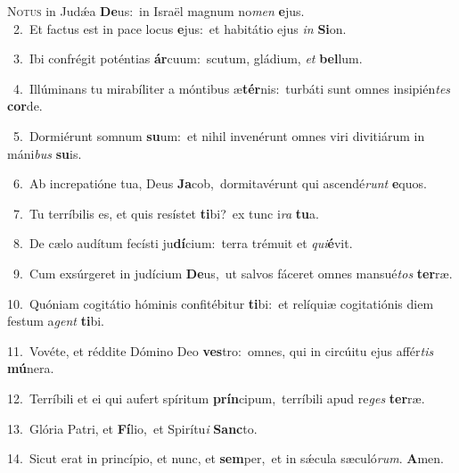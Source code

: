 \lettrine{\initial\textcolor{\initialcolor}{N}}{otus} in Judǽa \textbf{De}\-us:~\star in Israël magnum no\textit{men} \textbf{e}\-jus.\\
{\numbfont\textcolor{\numbcolor}{~2.}}~Et factus est in pace locus \textbf{e}\-jus:~\star et habitátio ejus \textit{in} \textbf{Si}\-on.\par
{\numbfont\textcolor{\numbcolor}{~3.}}~Ibi confrégit poténtias \textbf{ár}\-cuum:~\star scutum, gládium, \textit{et} \textbf{bel}\-lum.\par
{\numbfont\textcolor{\numbcolor}{~4.}}~Illúminans tu mirabíliter a móntibus æ\-\textbf{tér}\-nis:~\star turbáti sunt omnes insipién\textit{tes} \textbf{cor}\-de.\par
{\numbfont\textcolor{\numbcolor}{~5.}}~Dormiérunt somnum \textbf{su}\-um:~\star et nihil invenérunt omnes viri divitiárum in máni\textit{bus} \textbf{su}\-is.\par
{\numbfont\textcolor{\numbcolor}{~6.}}~Ab increpatióne tua, Deus \textbf{Ja}\-cob,~\star dormitavérunt qui ascendé\textit{runt} \textbf{e}\-quos.\par
{\numbfont\textcolor{\numbcolor}{~7.}}~Tu terríbilis es, et quis resístet \textbf{ti}\-bi?~\star ex tunc i\textit{ra} \textbf{tu}\-a.\par
{\numbfont\textcolor{\numbcolor}{~8.}}~De cælo audítum fecísti ju\-\textbf{dí}\-cium:~\star terra trémuit et \textit{qui}\-\textbf{é}vit.\par
{\numbfont\textcolor{\numbcolor}{~9.}}~Cum exsúrgeret in judícium \textbf{De}\-us,~\star ut salvos fáceret omnes mansué\textit{tos} \textbf{ter}\-ræ.\par
{\numbfont\textcolor{\numbcolor}{10.}}~Quóniam cogitátio hóminis confitébitur \textbf{ti}\-bi:~\star et relíquiæ cogitatiónis diem festum a\textit{gent} \textbf{ti}\-bi.\par
{\numbfont\textcolor{\numbcolor}{11.}}~Vovéte, et réddite Dómino Deo \textbf{ves}\-tro:~\star omnes, qui in circúitu ejus affér\textit{tis} \textbf{mú}\-nera.\par
{\numbfont\textcolor{\numbcolor}{12.}}~Terríbili et ei qui aufert spíritum \textbf{prín}\-cipum,~\star terríbili apud re\textit{ges} \textbf{ter}\-ræ.\par
{\numbfont\textcolor{\numbcolor}{13.}}~Glória Patri, et \textbf{Fí}\-lio,~\star et Spirítu\textit{i} \textbf{Sanc}\-to.\par
{\numbfont\textcolor{\numbcolor}{14.}}~Sicut erat in princípio, et nunc, et \textbf{sem}\-per,~\star et in sǽcula sæculó\-\textit{rum}\-. \textbf{A}\-men.\par
